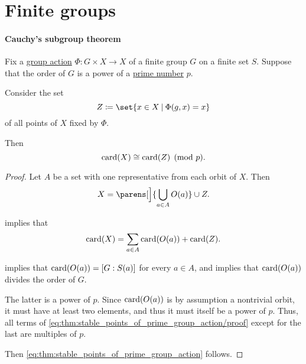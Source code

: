 \section{Finite groups}\label{sec:finite_groups}

\paragraph{Cauchy's subgroup theorem}

\begin{lemma}\label{thm:stable_points_of_prime_group_action}
  Fix a \hyperref[def:group_action]{group action} \( \Phi: G \times X \to X \) of a  finite group \( G \) on a finite set \( S \). Suppose that the order of \( G \) is a power of a \hyperref[def:prime_number]{prime number} \( p \).

  Consider the set
  \begin{equation}\label{eq:thm:stable_points_of_prime_group_action/fixed}
    Z \coloneqq \set{ x \in X \given \Phi(g, x) = x }
  \end{equation}
  of all points of \( X \) fixed by \( \Phi \).

  Then
  \begin{equation}\label{eq:thm:stable_points_of_prime_group_action}
    \operatorname{card}(X) \cong \operatorname{card}(Z) \pmod p.
  \end{equation}
\end{lemma}
\begin{proof}
  Let \( A \) be a set with one representative from each  orbit of \( X \). Then
  \begin{equation*}
    X = \parens[\Big]{ \bigcup_{a \in A} O(a) } \cup Z.
  \end{equation*}

   implies that
  \begin{equation}\label{eq:thm:stable_points_of_prime_group_action/proof}
    \operatorname{card}(X) = \sum_{a \in A} \operatorname{card}(O(a)) + \operatorname{card}(Z).
  \end{equation}

   implies that \( \operatorname{card}(O(a)) = [G: S(a)] \) for every \( a \in A \), and  implies that \( \operatorname{card}(O(a)) \) divides the order of \( G \).

  The latter is a power of \( p \). Since \( \operatorname{card}(O(a)) \) is by assumption a nontrivial orbit, it must have at least two elements, and thus it must itself be a power of \( p \). Thus, all terms of \eqref{eq:thm:stable_points_of_prime_group_action/proof} except for the last are multiples of \( p \).

  Then \eqref{eq:thm:stable_points_of_prime_group_action} follows.
\end{proof}

